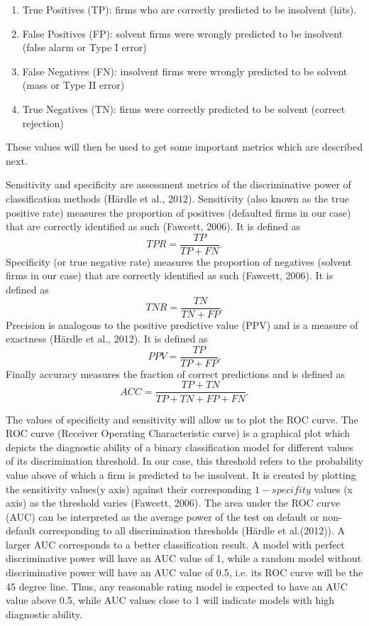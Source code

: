\documentclass{article}
\begin{document}
\begin{enumerate}
\item True Positives (TP): firms who are correctly predicted to be insolvent (hits).
\item False Positives (FP): solvent firms were wrongly predicted to be insolvent (false alarm or Type I error)
\item False Negatives (FN): insolvent firms were wrongly predicted to be solvent (mass or Type II error)
\item True Negatives (TN): firms were correctly predicted to be solvent (correct rejection) 
\end{enumerate}

These values will then be used to get some important metrics which are described next.

Sensitivity and specificity are assessment metrics of the discriminative power of classification methods (H{\"a}rdle et al., 2012). Sensitivity (also known as the true positive rate) measures the proportion of positives (defaulted firms in our case) that are correctly identified as such (Fawcett, 2006). It is defined as $$TPR=\frac{TP}{TP+FN}.$$ Specificity (or true negative rate) measures the proportion of negatives (solvent firms in our case) that are correctly identified as such (Fawcett, 2006). It is defined as $$TNR=\frac{TN}{TN+FP}.$$ Precision is analogous to the positive predictive value (PPV) and is a measure of exactness (H{\"a}rdle et al., 2012). It is defined as $$PPV=\frac{TP}{TP+FP}.$$ Finally accuracy measures the fraction of correct predictions and is defined as $$ACC = \frac{TP+TN}{TP+TN+FP+FN}.$$

The values of specificity and sensitivity will allow us to plot the ROC curve. The ROC curve (Receiver Operating Characteristic curve) is a graphical plot which depicts the diagnostic ability of a binary classification model for different values of its discrimination threshold. In our case, this threshold refers to the probability value above of which a firm is predicted to be insolvent. It is created by plotting the sensitivity values(y axis) against their corresponding $1-specifity$ values (x axis) as the threshold varies (Fawcett, 2006). The area under the ROC curve (AUC) can be interpreted as the average power of the test on default or non-default corresponding to all discrimination thresholds (H\"ardle et al.(2012)). A larger AUC corresponds to a better classification result. A model with perfect discriminative power will have an AUC value of 1, while a random model without discriminative power will have an AUC value of 0.5, i.e. its ROC curve will be the 45 degree line. Thus, any reasonable rating model is expected to have an AUC value above 0.5, while AUC values close to 1 will indicate models with high diagnostic ability.  
\end{document}
